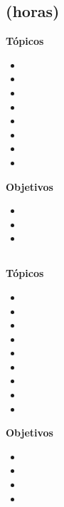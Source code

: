 \subsection{\NCCUATRODef  (\NCCUATROHours horas)}\label{sec:BOK-NC4}

\textbf{Tópicos}
\begin{itemize}
	\item \NCCUATROTopicTecnologias
	\item \NCCUATROTopicCaracteristicas
	\item \NCCUATROTopicRol
	\item \NCCUATROTopicNaturaleza
	\item \NCCUATROTopicProtocolos
	\item \NCCUATROTopicHerramientas
	\item \NCCUATROTopicDesarrollo
	\item \NCCUATROTopicPublicacion
\end{itemize}

\textbf{Objetivos}
\begin{itemize}
	\item \NCCUATROObjUNO
	\item \NCCUATROObjDOS
	\item \NCCUATROObjTRES
\end{itemize}

\subsection{\NCCINCODef }\label{sec:BOK-NC5}

\textbf{Tópicos}
\begin{itemize}
	\item \NCCINCOTopicProtocolos
	\item \NCCINCOTopicPrincipios
	\item \NCCINCOTopicSitios
	\item \NCCINCOTopicLlamadas
	\item \NCCINCOTopicObjetos
	\item \NCCINCOTopicEl
	\item \NCCINCOTopicHerramientas
	\item \NCCINCOTopicTopicos
	\item \NCCINCOTopicAplicaciones
\end{itemize}

\textbf{Objetivos}
\begin{itemize}
	\item \NCCINCOObjUNO
	\item \NCCINCOObjDOS
	\item \NCCINCOObjTRES
	\item \NCCINCOObjCUATRO
\end{itemize}


